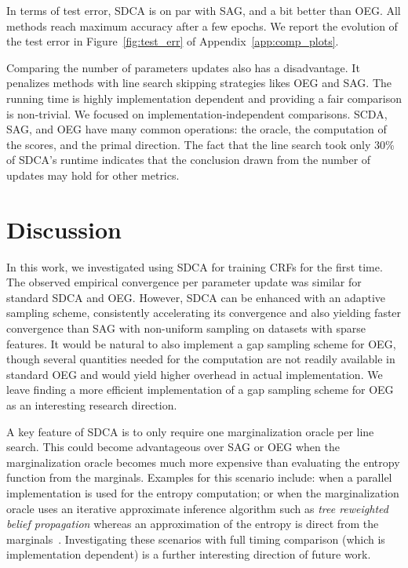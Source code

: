 In terms of test error, SDCA is on par with SAG, and a bit better than OEG.
All methods reach maximum accuracy after a few epochs.
We report the evolution of the test error in Figure~\ref{fig:test_err} of Appendix~\ref{app:comp_plots}.

Comparing the number of parameters updates also has a disadvantage.
It penalizes methods with line search skipping strategies likes OEG and SAG.
The running time is highly implementation dependent and providing a fair comparison is non-trivial.
We focused on implementation-independent comparisons.
SCDA, SAG, and OEG have many common operations: the oracle, the computation of the scores, and the primal direction.
The fact that the line search took only 30\% of SDCA's runtime indicates that the conclusion drawn from the number of updates may hold for other metrics.

\section{Discussion} \label{sec:discussion}

In this work, we investigated using SDCA for training CRFs for the first time.
The observed empirical convergence per parameter update was similar for standard SDCA and OEG.
However, SDCA can be enhanced with an adaptive sampling scheme, consistently accelerating its convergence and also yielding faster convergence than SAG with non-uniform sampling on datasets with sparse features.
It would be natural to also implement a gap sampling scheme for OEG, though several quantities needed for the computation are not readily available in standard OEG and would yield higher overhead in actual implementation.
We leave finding a more efficient implementation of a gap sampling scheme for OEG as an interesting research direction.

A key feature of SDCA is to only require one marginalization oracle per line search.
This could become advantageous over SAG or OEG when the marginalization oracle becomes much more expensive than evaluating the entropy function from the marginals.
Examples for this scenario include: when a parallel implementation is used for the entropy computation; or when the marginalization oracle uses an iterative approximate inference algorithm such as \emph{tree reweighted belief propagation} whereas an approximation of the entropy is direct from the marginals~\citep{kirshnan15barrierFW}.
Investigating these scenarios with full timing comparison (which is implementation dependent) is a further interesting direction of future work.

